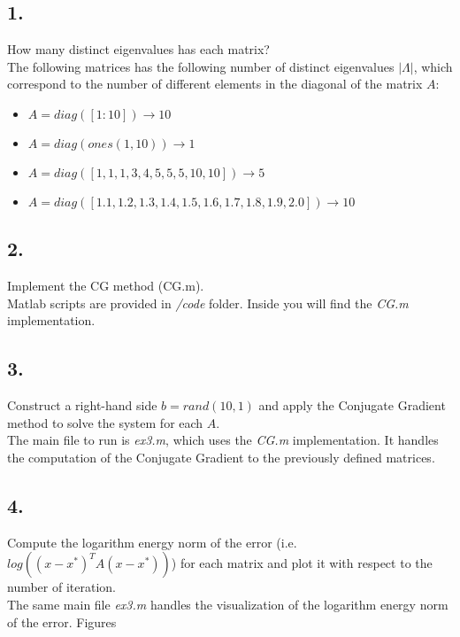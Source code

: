 \documentclass[unicode,11pt,a4paper,oneside,numbers=endperiod,openany]{scrartcl}
\begin{document}
\subsection*{1.}
How many distinct eigenvalues has each matrix?\\

The following matrices has the following number of distinct eigenvalues $| \Lambda |$,
which correspond to the number of different elements in the diagonal of the matrix $A$:
\begin{itemize}
    \item[ ] $A = diag([1:10]) \rightarrow 10$
    \item[ ] $A = diag(ones(1,10)) \rightarrow 1$
    \item[ ] $A = diag([1, 1, 1, 3, 4, 5, 5, 5, 10, 10]) \rightarrow 5$
    \item[ ] $A = diag([1.1, 1.2, 1.3, 1.4, 1.5, 1.6, 1.7, 1.8, 1.9, 2.0]) \rightarrow 10$
\end{itemize}

\subsection*{2.}
Implement the CG method (CG.m).\\

Matlab scripts are provided in \textit{/code} folder.
Inside you will find the \textit{CG.m} implementation.

\subsection*{3.}
Construct a right-hand side $b = rand(10,1)$
and apply the Conjugate Gradient method to solve the system for each $A$.\\

The main file to run is \textit{ex3.m}, which uses the \textit{CG.m} implementation.
It handles the computation of the Conjugate Gradient to the previously defined matrices.

\subsection*{4.}
Compute the logarithm energy norm of the error (i.e. $log((x - x^*)^T A(x - x^*))$)
for each matrix and plot it with respect to the number of iteration.\\

The same main file \textit{ex3.m} handles the visualization of the logarithm energy norm
of the error.
Figures %
\end{document}
